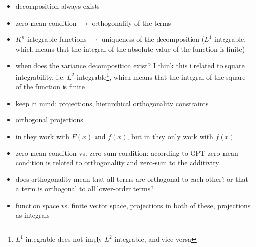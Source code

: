 \begin{itemize}
    \item decomposition always exists
    \item zero-mean-condition $\rightarrow$ orthogonality of the terms
    \item $K^n$-integrable functions $\rightarrow$ uniqueness of the decomposition ($L^1$ integrable, which means that the integral of the absolute value of the function is finite)
    \item when does the variance decomposition exist? I think this i related to square integrability, i.e. $L^2$ integrable\footnote{$L^1$ integrable does not imply $L^2$ integrable, and vice versa}, which means that the integral of the square of the function is finite
    \item keep in mind: projections, hierarchical orthogonality constraints
\end{itemize}



\begin{itemize}
    \item orthogonal projections
\end{itemize}

\begin{itemize}
    \item in \cite{hooker_discovering_2004} they work with $F(x)$ and $f(x)$, but in \cite{sobol_global_2001} they only work with $f(x)$
    \item zero mean condition vs. zero-sum condition: according to GPT zero mean condition is related to orthogonality and zero-sum to the additivity
    \item does orthogonality mean that all terms are orthogonal to each other? or that a term is orthogonal to all lower-order terms?
    \item function space vs. finite vector space, projections in both of these, projections as integrals
\end{itemize}




